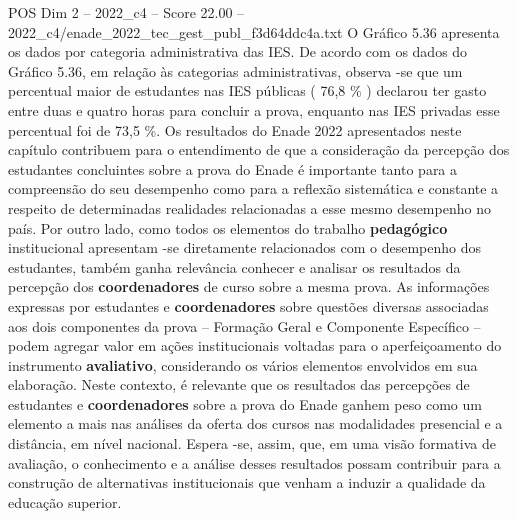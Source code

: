 \begin{textsample}{POS Dim 2 – 2022\_c4 – Score 22.00 – 2022\_c4/enade\_2022\_tec\_gest\_publ\_f3d64ddc4a.txt}
O Gráfico 5.36 apresenta os dados por categoria administrativa das IES.
De acordo com os dados do Gráfico 5.36, em relação às categorias administrativas, observa -se que um percentual maior de estudantes nas IES públicas ( 76,8 \% ) declarou ter gasto entre duas e quatro horas para concluir a prova, enquanto nas IES privadas esse percentual foi de 73,5 \%.
Os resultados do Enade 2022 apresentados neste capítulo contribuem para o entendimento de que a consideração da percepção dos estudantes concluintes sobre a prova do Enade é importante tanto para a compreensão do seu desempenho como para a reflexão sistemática e constante a respeito de determinadas realidades relacionadas a esse mesmo desempenho no país.
Por outro lado, como todos os elementos do trabalho \textbf{pedagógico} institucional apresentam -se diretamente relacionados com o desempenho dos estudantes, também ganha relevância conhecer e analisar os resultados da percepção dos \textbf{coordenadores} de curso sobre a mesma prova.
As informações expressas por estudantes e \textbf{coordenadores} sobre questões diversas associadas aos dois componentes da prova – Formação Geral e Componente Específico – podem agregar valor em ações institucionais voltadas para o aperfeiçoamento do instrumento \textbf{avaliativo}, considerando os vários elementos envolvidos em sua elaboração.
Neste contexto, é relevante que os resultados das percepções de estudantes e \textbf{coordenadores} sobre a prova do Enade ganhem peso como um elemento a mais nas análises da oferta dos cursos nas modalidades presencial e a distância, em nível nacional.
Espera -se, assim, que, em uma visão formativa de avaliação, o conhecimento e a análise desses resultados possam contribuir para a construção de alternativas institucionais que venham a induzir a qualidade da educação superior.

\end{textsample}
